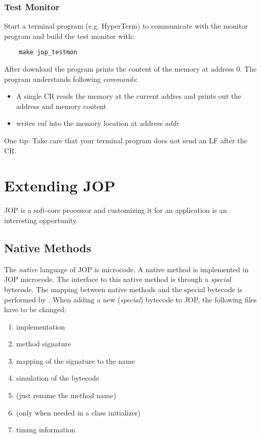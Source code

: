\subsubsection{Test Monitor}


Start a terminal program (e.g. HyperTerm) to communicate with the
monitor program and build the test monitor with:
%
\begin{lstlisting}
    make jop_testmon
\end{lstlisting}
%
After download the program prints the content of the memory at
address 0. The program understands following \emph{commands}:

\begin{itemize}
    \item A single CR reads the memory at the current addres
    and prints out the address and memory content
    \item {} writes $val$ into the memory location at
    address $addr$
\end{itemize}

One tip: Take care that your terminal program does not send an LF
after the CR.


\section{Extending JOP}


JOP is a soft-core processor and customizing it for an application
is an interesting opportunity.

\subsection{Native Methods}

 The \emph{native} language of JOP is microcode.
A native method is implemented in JOP microcode. The interface to
this native method is through a \emph{special} bytecode. The mapping
between native methods and the special bytecode is performed by
. When adding a new (\emph{special}) bytecode to JOP,
the following files have to be changed:
\begin{enumerate}
    \item {} implementation
    \item {} method signature
    \item {} mapping of the signature to the name
    \item {} simulation of the bytecode
    \item {} (just rename the method name)
    \item {} (only when needed in a class
        initializer)
    \item {} timing information
\end{enumerate}

